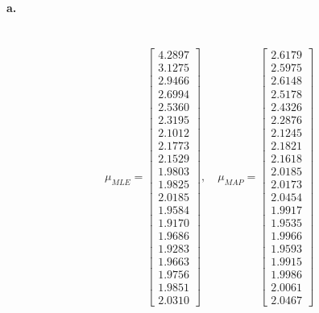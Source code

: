 \documentclass[a4paper]{article}
\begin{document}
\paragraph{a.} ~\\
\begin{align*}
	\mu_{MLE} = \begin{bmatrix}
		4.2897 \\
    	3.1275 \\
    	2.9466 \\
    	2.6994 \\
    	2.5360 \\
    	2.3195 \\
    	2.1012 \\
    	2.1773 \\
    	2.1529 \\
    	1.9803 \\
    	1.9825 \\
    	2.0185 \\
    	1.9584 \\
    	1.9170 \\
    	1.9686 \\
    	1.9283 \\
    	1.9663 \\
    	1.9756 \\
    	1.9851 \\
    	2.0310
	\end{bmatrix}, \quad
	\mu_{MAP} = \begin{bmatrix}
		2.6179 \\
    	2.5975 \\
    	2.6148 \\
    	2.5178 \\
    	2.4326 \\
    	2.2876 \\
    	2.1245 \\
    	2.1821 \\
   		2.1618 \\
    	2.0185 \\
    	2.0173 \\
    	2.0454 \\
    	1.9917 \\
    	1.9535 \\
    	1.9966 \\
    	1.9593 \\
    	1.9915 \\
    	1.9986 \\
    	2.0061 \\
    	2.0467
	\end{bmatrix}
\end{align*}
\end{document}
